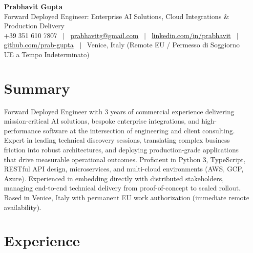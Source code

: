\documentclass[a4paper,10pt]{article}
\begin{document}
\begin{minipage}[c]{0.80\textwidth}
  {\Huge\bfseries Prabhavit Gupta}\\[3pt]
  {\color{accent}\large Forward Deployed Engineer: Enterprise AI Solutions, Cloud Integrations \& Production Delivery}\\[6pt]
  {\footnotesize +39 351 610 7807 ~$\vert$~
  \href{mailto:prabhavitg@gmail.com}{prabhavitg@gmail.com} ~$\vert$~
  \href{https://www.linkedin.com/in/prabhavit/}{linkedin.com/in/prabhavit} ~$\vert$~
  \href{https://github.com/prab-gupta}{github.com/prab-gupta} ~$\vert$~
  Venice, Italy (Remote EU / Permesso di Soggiorno UE a Tempo Indeterminato)}
\end{minipage}\hfill

\section{Summary}
Forward Deployed Engineer with 3 years of commercial experience delivering mission-critical AI solutions, bespoke enterprise integrations, and high-performance software at the intersection of engineering and client consulting. Expert in leading technical discovery sessions, translating complex business friction into robust architectures, and deploying production-grade applications that drive measurable operational outcomes. Proficient in Python 3, TypeScript, RESTful API design, microservices, and multi-cloud environments (AWS, GCP, Azure). Experienced in embedding directly with distributed stakeholders, managing end-to-end technical delivery from proof-of-concept to scaled rollout. Based in Venice, Italy with permanent EU work authorization (immediate remote availability).

\section{Experience}
\end{document}
